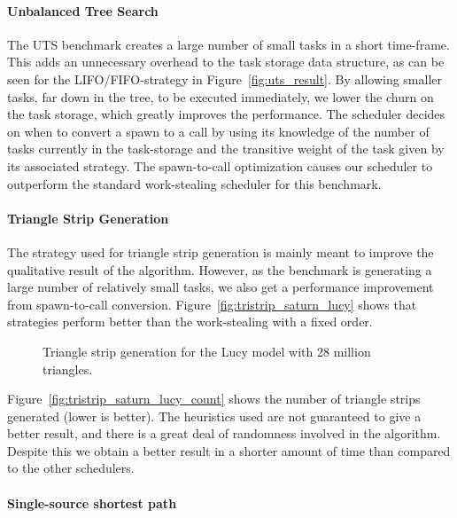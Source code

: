 \documentclass[a4paper,11pt]{article}
\begin{document}
\paragraph{Unbalanced Tree Search}

The UTS benchmark creates a large number of small tasks in a short
time-frame. This adds an unnecessary overhead to the task storage
data structure, as can be seen for the LIFO/FIFO-strategy in
Figure~\ref{fig:uts_result}. By allowing smaller tasks, far down in
the tree, to be executed immediately, we lower the churn on the task
storage, which greatly improves the performance. The scheduler decides
on when to convert a spawn to a call by using its knowledge of the
number of tasks currently in the task-storage and the transitive
weight of the task given by its associated strategy. The spawn-to-call
optimization causes our scheduler to outperform the standard
work-stealing scheduler for this benchmark.

\paragraph{Triangle Strip Generation}

The strategy used for triangle strip generation is mainly meant to
improve the qualitative result of the algorithm. However, as the
benchmark is generating a large number of relatively small tasks, we
also get a performance improvement from spawn-to-call conversion.
Figure~\ref{fig:tristrip_saturn_lucy} shows that strategies
perform better than the work-stealing with a fixed order.

\begin{figure}
\centering
{}
\caption{Triangle strip generation for the Lucy model with 28 million triangles.}
\end{figure}

Figure~\ref{fig:tristrip_saturn_lucy_count} shows the number of
triangle strips generated (lower is better). The heuristics used are
not guaranteed to give a better result, and there is a great deal of
randomness involved in the algorithm. Despite this we obtain a better
result in a shorter amount of time than compared to the other
schedulers.

\paragraph{Single-source shortest path}
\end{document}
